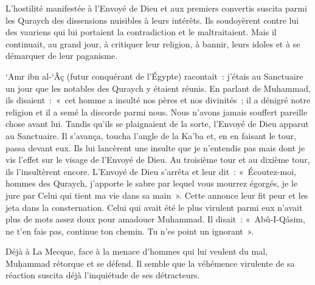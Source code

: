 L'hostilité manifestée à l'Envoyé de Dieu et aux premiers convertis
suscita parmi les Quraych des dissensions nuisibles à leurs intérêts.
Ils soudoyèrent contre lui des vauriens qui lui portaient la
contradiction et le maltraitaient. Mais il continuait, au grand jour, à
critiquer leur religion, à bannir, leurs idoles et à se démarquer de
leur paganisme.

{`Amr ibn al-`Âç (futur conquérant de l'Égypte) racontait~: j'étais
au Sanctuaire un jour que les notables des Quraych y étaient réunis. En
parlant de Muhammad, ils disaient~:~«~cet homme a insulté nos pères et
nos divinités~; il a dénigré notre religion et il a semé la discorde
parmi nous. Nous n'avons jamais souffert pareille chose avant lui.
Tandis qu'ils se plaignaient de la sorte, l'Envoyé de Dieu apparut au
Sanctuaire. Il s'avança, toucha l'angle de la Ka'ba et, en en faisant le
tour, passa devant eux. Ils lui lancèrent une insulte que je n'entendis
pas mais dont je vis l'effet sur le visage de l'Envoyé de Dieu. Au
troisième tour et au dixième tour, ils l'insultèrent encore. L'Envoyé de
Dieu s'arrêta et leur dit~: «~Écoutez-moi, hommes des Quraych, j'apporte
le sabre par lequel vous mourrez égorgés, je le jure par Celui qui tient
ma vie dans sa main~». Cette annonce leur fit peur et les jeta dans la
consternation. Celui qui avait été le plus virulent parmi eux n'avait
plus de mots assez doux pour amadouer Muhammad. Il disait~:
«~Abû-I-Qâsim, ne t'en fais pas, continue ton chemin. Tu n'es point un
ignorant~».}

Déjà à La Mecque, face à la menace d'hommes qui lui veulent du mal,
Muḥammad rétorque et se défend. Il semble que la véhémence virulente de
sa réaction suscita déjà l'inquiétude de ses détracteurs.


